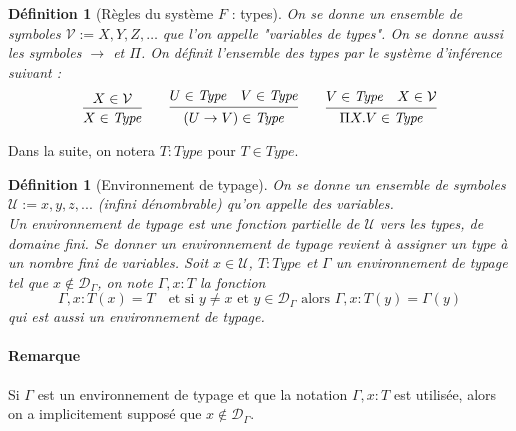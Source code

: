 \documentclass[a4paper,12pt]{article}
\theoremstyle{plain}
\newtheorem{defi}[theo]{Définition}
\begin{document}
\begin{defi}[Règles du système $F$ : types]
\label{RSFTY}
On se donne un ensemble de symboles $\mathcal{V} := {X, Y, Z, \dots}$ que l'on appelle "variables de types". On se donne aussi les symboles $\to$ et $\Pi$. On définit l'ensemble des types par le système d'inférence suivant :
$$
\begin{prooftree}[center = false]
\hypo{X \in \mathcal{V}}
\infer1{X \in \mathit{Type}}
\end{prooftree}
\qquad
\begin{prooftree}[center = false]
\hypo{U\in \mathit{Type}\quad V\in \mathit{Type}}
\infer1{(U \to V) \in \mathit{Type}}
\end{prooftree}
\qquad
\begin{prooftree}[center = false]
\hypo{V \in \mathit{Type}\quad X \in \mathcal{V}}
\infer1{\Pi X.V \in \mathit{Type}}
\end{prooftree}
$$
\end{defi}

Dans la suite, on notera $T : \mathit{Type}$ pour
$T \in \mathit{Type}$.

\begin{defi}[Environnement de typage]
On se donne un ensemble de symboles $\mathcal{U} := {x, y, z, ...}$ (infini dénombrable) qu'on appelle des variables.\\
Un environnement de typage est une fonction partielle de $\mathcal{U}$ vers les types, de domaine fini. Se donner un environnement de typage revient à assigner un type à un nombre fini de variables. Soit $x\in \mathcal{U}$, $T: \mathit{Type}$ et $\Gamma$ un environnement de typage tel que $x \not \in \mathcal{D}_\Gamma$, on note $\Gamma, x:T$ la fonction
$$
\Gamma, x:T (x) = T \quad \text{et si $y \neq x$ et $y \in \mathcal{D}_\Gamma$ alors } \Gamma, x:T (y) = \Gamma(y)
$$
qui est aussi un environnement de typage.
\end{defi}

\paragraph{Remarque}

Si $\Gamma$ est un environnement de typage et que la notation $\Gamma, x:T$ est utilisée, alors on a implicitement supposé que $x \not \in \mathcal{D}_\Gamma$.
\end{document}
